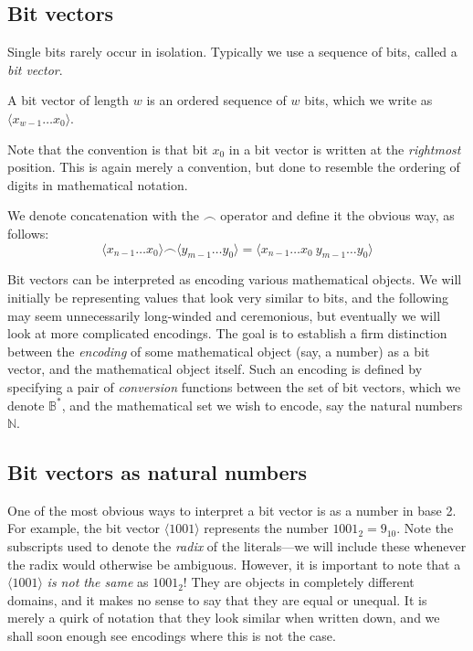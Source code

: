 \subsection{Bit vectors}

\newcommand\bitvector[1]{\langle #1 \rangle}
\newcommand\bitconcat{\frown}

Single bits rarely occur in isolation.  Typically we use a sequence of
bits, called a \emph{bit vector}.

\begin{definition}
  A bit vector of length $w$ is an ordered sequence of $w$ bits, which
  we write as $\bitvector{x_{w-1}\ldots{}x_{0}}$.
\end{definition}

Note that the convention is that bit $x_{0}$ in a bit vector is
written at the \emph{rightmost} position.  This is again merely a
convention, but done to resemble the ordering of digits in
mathematical notation.

\begin{definition}
  We denote concatenation with the $\bitconcat$ operator and define it
  the obvious way, as follows:
  \[
    \bitvector{x_{n-1}\ldots{}x_{0}} \bitconcat \bitvector{y_{m-1}\ldots{}y_{0}} =
    \bitvector{x_{n-1}\ldots{}x_{0}~y_{m-1}\ldots{}y_{0}}
  \]
\end{definition}


Bit vectors can be interpreted as encoding various mathematical
objects.  We will initially be representing values that look very
similar to bits, and the following may seem unnecessarily long-winded
and ceremonious, but eventually we will look at more complicated
encodings.  The goal is to establish a firm distinction between the
\emph{encoding} of some mathematical object (say, a number) as a bit
vector, and the mathematical object itself.  Such an encoding is
defined by specifying a pair of \emph{conversion} functions between
the set of bit vectors, which we denote $\mathbb{B}^{*}$, and the
mathematical set we wish to encode, say the natural numbers
$\mathbb{N}$.

\subsection{Bit vectors as natural numbers}
\label{sec:bitnats}

One of the most obvious ways to interpret a bit vector is as a number
in base 2.  For example, the bit vector $\bitvector{1001}$ represents
the number $1001_{2} = 9_{10}$.  Note the subscripts used to denote
the \emph{radix} of the literals---we will include these whenever the
radix would otherwise be ambiguous.  However, it is important to note
that a $\bitvector{1001}$ \emph{is not the same} as $1001_{2}$!  They
are objects in completely different domains, and it makes no sense to
say that they are equal or unequal.  It is merely a quirk of notation
that they look similar when written down, and we shall soon enough see
encodings where this is not the case.

